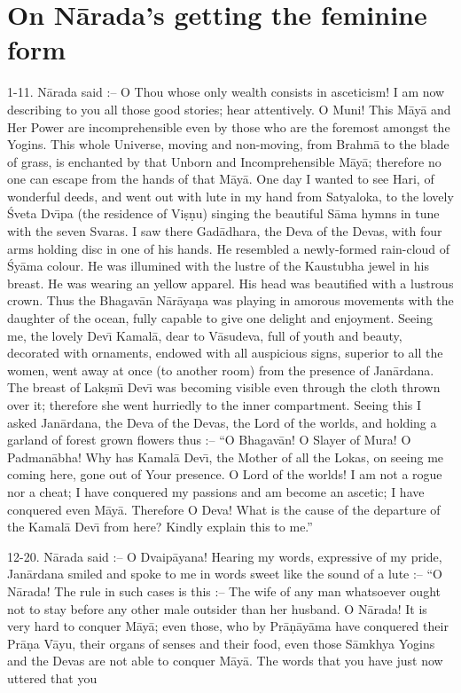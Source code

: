 \chapter{On N\=arada's getting the feminine form}

1-11. N\=arada said :-- O Thou whose only wealth consists in asceticism! I am now describing to you all those good stories; hear attentively. O Muni! This M\=ay\=a and Her Power are incomprehensible even by those who are the foremost amongst the Yogins. This whole Universe, moving and non-moving, from Brahm\=a to the blade of grass, is enchanted by that Unborn and Incomprehensible M\=ay\=a; therefore no one can escape from the hands of that M\=ay\=a. One day I wanted to see Hari, of wonderful deeds, and went out with lute in my hand from Satyaloka, to the lovely \'Sveta Dv\={\i}pa (the residence of Vi\d{s}\d{n}u) singing the beautiful S\=ama hymns in tune with the seven Svaras. I saw there Gad\=adhara, the Deva of the Devas, with four arms holding disc in one of his hands. He resembled a newly-formed rain-cloud of \'Sy\=ama colour. He was illumined with the lustre of the Kaustubha jewel in his breast. He was wearing an yellow apparel. His head was beautified with a lustrous crown. Thus the Bhagav\=an N\=ar\=aya\d{n}a was playing in amorous movements with the daughter of the ocean, fully capable to give one delight and enjoyment. Seeing me, the lovely Dev\={\i} Kamal\=a, dear to V\=asudeva, full of youth and beauty, decorated with ornaments, endowed with all auspicious signs, superior to all the women, went away at once (to another room) from the presence of Jan\=ardana. The breast of Lak\d{s}m\={\i} Dev\={\i} was becoming visible even through the cloth thrown over it; therefore she went hurriedly to the inner compartment. Seeing this I asked Jan\=ardana, the Deva of the Devas, the Lord of the worlds, and holding a garland of forest grown flowers thus :-- ``O Bhagav\=an! O Slayer of Mura! O Padman\=abha! Why has Kamal\=a Dev\={\i}, the Mother of all the Lokas, on seeing me coming here, gone out of Your presence. O Lord of the worlds! I am not a rogue nor a cheat; I have conquered my passions and am become an ascetic; I have conquered even M\=ay\=a. Therefore O Deva! What is the cause of the departure of the Kamal\=a Dev\={\i} from here? Kindly explain this to me.''

12-20. N\=arada said :-- O Dvaip\=ayana! Hearing my words, expressive of my pride, Jan\=ardana smiled and spoke to me in words sweet like the sound of a lute :-- ``O N\=arada! The rule in such cases is this :-- The wife of any man whatsoever ought not to stay before any other male outsider than her husband. O N\=arada! It is very hard to conquer M\=ay\=a; even those, who by Pr\=a\d{n}\=ay\=ama have conquered their Pr\=a\d{n}a V\=ayu, their organs of senses and their food, even those S\=amkhya Yogins and the Devas are not able to conquer M\=ay\=a. The words that you have just now uttered that you

